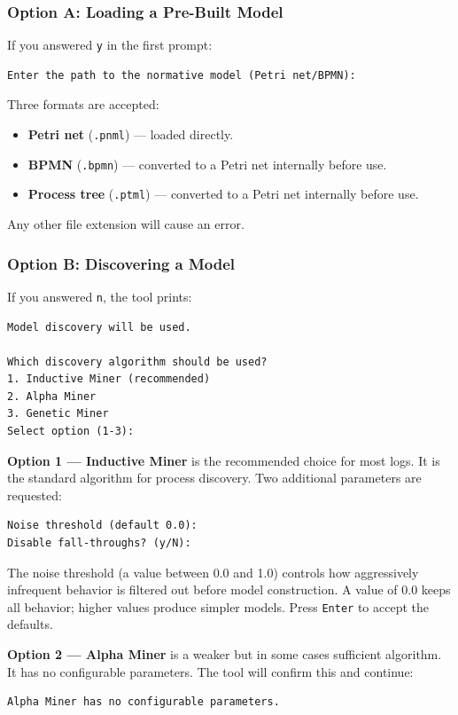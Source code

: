 \documentclass[12pt,a4paper]{article}
\begin{document}
\subsubsection{Option A: Loading a Pre-Built Model}
If you answered \texttt{y} in the first prompt:
\begin{verbatim}
Enter the path to the normative model (Petri net/BPMN):
\end{verbatim}
Three formats are accepted:
\begin{itemize}
    \item \textbf{Petri net} (\texttt{.pnml}) --- loaded directly.
    \item \textbf{BPMN} (\texttt{.bpmn}) --- converted to a Petri net internally before use.
    \item \textbf{Process tree} (\texttt{.ptml}) --- converted to a Petri net internally before use.
\end{itemize}
Any other file extension will cause an error.

\subsubsection{Option B: Discovering a Model}
If you answered \texttt{n}, the tool prints:
\begin{verbatim}
Model discovery will be used.

Which discovery algorithm should be used?
1. Inductive Miner (recommended)
2. Alpha Miner
3. Genetic Miner
Select option (1-3):
\end{verbatim}

\textbf{Option 1 --- Inductive Miner} is the recommended choice for most logs. It is the standard algorithm for process discovery. Two additional parameters are requested:
\begin{verbatim}
Noise threshold (default 0.0):
Disable fall-throughs? (y/N):
\end{verbatim}
The noise threshold (a value between 0.0 and 1.0) controls how aggressively infrequent behavior is filtered out before model construction. A value of 0.0 keeps all behavior; higher values produce simpler models. Press \texttt{Enter} to accept the defaults.

\textbf{Option 2 --- Alpha Miner} is a weaker but in some cases sufficient algorithm. It has no configurable parameters. The tool will confirm this and continue:
\begin{verbatim}
Alpha Miner has no configurable parameters.
\end{verbatim}
\end{document}
